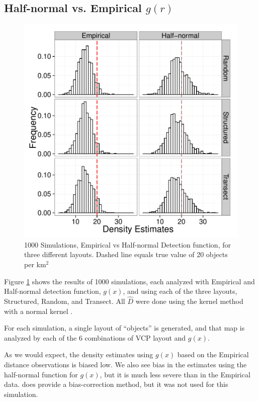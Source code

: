 \documentclass[12pt]{article}
\begin{document}
\subsection{Half-normal vs. Empirical $g(r)$}
\begin{figure}

	\includegraphics[width=\textwidth]{../images/Emp_Vs_Hnorm.pdf}
	\caption{1000 Simulations, Empirical vs Half-normal Detection function, for three different layouts. Dashed line equals true value of 20 objects per km$^2$\label{fig:sim1}}
		
\end{figure}
Figure \ref{fig:sim1} shows the results of 1000 simulations, each analyzed with Empirical and Half-normal detection function, $g(x)$, and using each of the three layouts, Structured, Random, and Transect. All $\hat{D}$  were done using the kernel method with a normal kernel \parencite{quang1993}.

For each simulation, a single layout of ``objects'' is generated, and that map is analyzed by each of the 6 combinations of VCP layout and $g(x)$. 

As we would expect, the density estimates using $g(x)$ based on the Empirical distance observations is biased low. We also see bias in the estimates using the half-normal function for $g(x)$, but it is much less severe than in the Empirical data. \textcite{quang1993} does provide a bias-correction method, but it was not used for this simulation.
\end{document}
